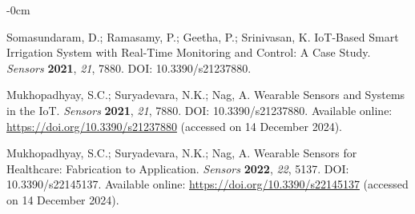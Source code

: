 \documentclass[journal]{Definitions/mdpi}
\begin{document}
\begin{adjustwidth}{-\extralength}{0cm}
\begin{thebibliography}{999}
Somasundaram, D.; Ramasamy, P.; Geetha, P.; Srinivasan, K. IoT-Based Smart Irrigation System with Real-Time Monitoring and Control: A Case Study. {\em Sensors} {\bf 2021}, {\em 21}, 7880. DOI: 10.3390/s21237880.

Mukhopadhyay, S.C.; Suryadevara, N.K.; Nag, A. Wearable Sensors and Systems in the IoT. {\em Sensors} {\bf 2021}, {\em 21}, 7880. DOI: 10.3390/s21237880. Available online: \url{https://doi.org/10.3390/s21237880} (accessed on 14 December 2024).

Mukhopadhyay, S.C.; Suryadevara, N.K.; Nag, A. Wearable Sensors for Healthcare: Fabrication to Application. {\em Sensors} {\bf 2022}, {\em 22}, 5137. DOI: 10.3390/s22145137. Available online: \url{https://doi.org/10.3390/s22145137} (accessed on 14 December 2024).


\end{thebibliography}
\end{adjustwidth}
\end{document}
